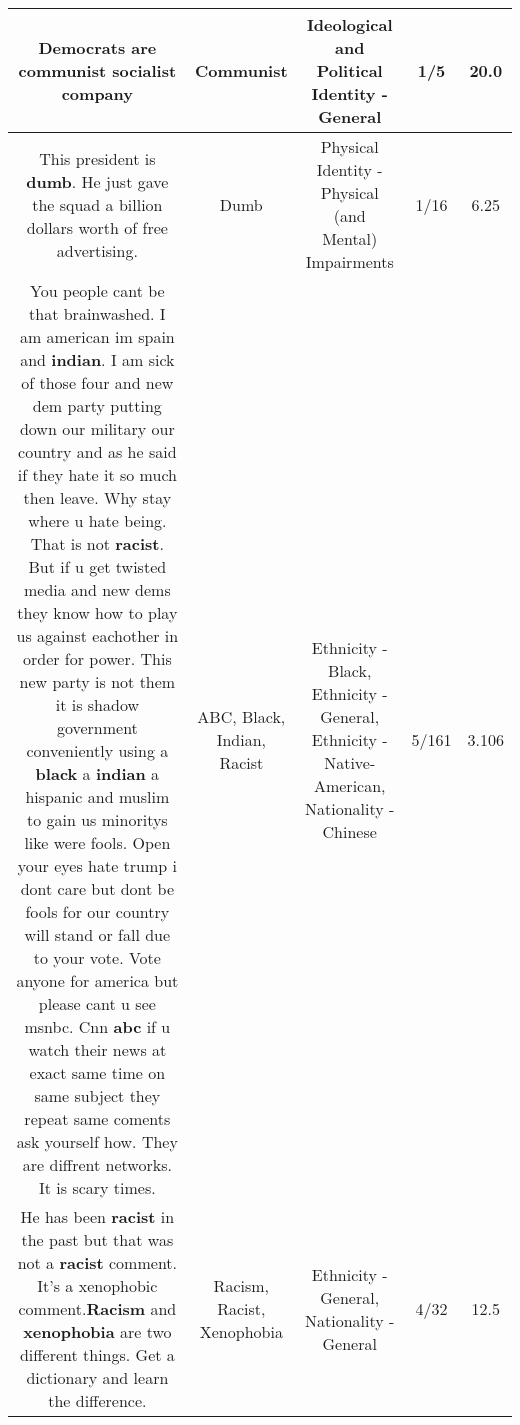 \documentclass[11pt]{article}
\newlength\mylength
\begin{document}
\begin{center}
\begin{longtable}{|C{.65\mylength}|C{.30\mylength}|C{.12\mylength}|C{.12\mylength}|C{.12\mylength}|}
  \small Democrats are \textbf{communist} socialist company\normalsize   & Communist &  Ideological and Political Identity - General & 1/5 & 20.0 \\  \hline
  \small This president is \textbf{dumb}. He just gave the squad a billion dollars worth of free advertising.\normalsize   & Dumb & Physical Identity - Physical (and Mental) Impairments & 1/16 & 6.25 \\  \hline
  \small You people cant be that brainwashed. I am american im spain and \textbf{indian}. I am sick of those four and new dem party putting down our military our country and as he said if they hate it so much then leave. Why stay where u hate being. That is not \textbf{racist}. But if u get twisted media and new dems they know how to play us against eachother in order for power. This new party is not them it is shadow government conveniently using a \textbf{black} a \textbf{indian} a hispanic and muslim to gain us minoritys like were fools. Open your eyes hate trump i dont care but dont be fools for our country will stand or fall due to your vote. Vote anyone for america but please cant u see msnbc. Cnn \textbf{abc} if u watch their news at exact same time on same subject they repeat same coments ask yourself how. They are diffrent networks. It is scary times.\normalsize   & ABC, Black, Indian, Racist & Ethnicity - Black, Ethnicity - General, Ethnicity - Native-American, Nationality - Chinese & 5/161 & 3.106 \\  \hline
  \small He has been \textbf{racist} in the past but that was not a \textbf{racist} comment. It's a xenophobic comment.\textbf{Racism} and \textbf{xenophobia} are two different things. Get a dictionary and learn the difference.\normalsize   & Racism, Racist, Xenophobia & Ethnicity - General, Nationality - General & 4/32 & 12.5 \\  \hline

\end{longtable}
\end{center}
\end{document}
